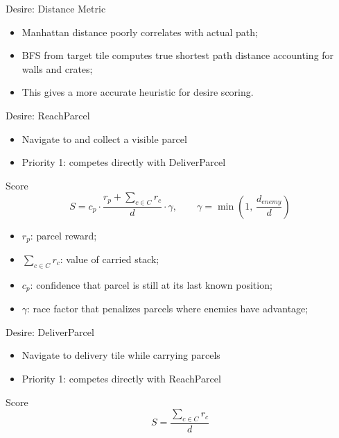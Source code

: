\begin{frame}{Desire: Distance Metric}
  \begin{itemize}
    \item Manhattan distance poorly correlates with actual path;
    \item BFS from target tile computes true shortest path distance accounting for walls and crates;
    \item This gives a more accurate heuristic for desire scoring.
  \end{itemize}
\end{frame}

\begin{frame}{Desire: ReachParcel}
  \begin{itemize}
    \item Navigate to and collect a visible parcel
    \item Priority 1: competes directly with DeliverParcel
  \end{itemize}
  \begin{block}{Score}
    \[ S = c_p \cdot \frac{r_p + \sum_{c \in C} r_c}{d} \cdot \gamma, \qquad
       \gamma = \min\!\left(1,\, \frac{d_{enemy}}{d}\right) \]
    \begin{itemize}
        \item $r_p$: parcel reward;
        \item $\sum_{c \in C} r_c$: value of carried stack;
        \item $c_p$: confidence that parcel is still at its last known position;
        \item $\gamma$: race factor that penalizes parcels where enemies have advantage;
    \end{itemize}
  \end{block}
\end{frame}

\begin{frame}{Desire: DeliverParcel}
  \begin{itemize}
    \item Navigate to delivery tile while carrying parcels
    \item Priority 1: competes directly with ReachParcel
  \end{itemize}
  \begin{block}{Score}
    \[ S = \frac{\sum_{c \in C} r_c}{d} \]
  \end{block}
\end{frame}

